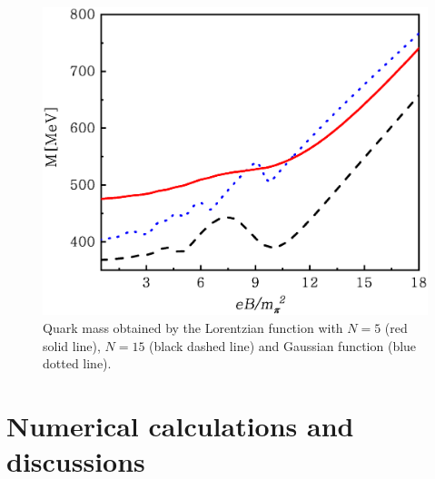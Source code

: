 \documentclass[prd, showpacs,nofootinbib,amsmath,amssymb,12pt]{revtex4}
\begin{document}
\begin{figure}[ht]
	\centering
	\includegraphics[scale=0.3]{compare.eps}
	\caption{Quark mass obtained by the Lorentzian function with $N=5$ (red solid line), $N=15$ (black dashed line) and Gaussian function (blue dotted line).}
	\label{f1}
\end{figure}



\section{Numerical calculations and discussions}
\label{sec:3}
\end{document}
